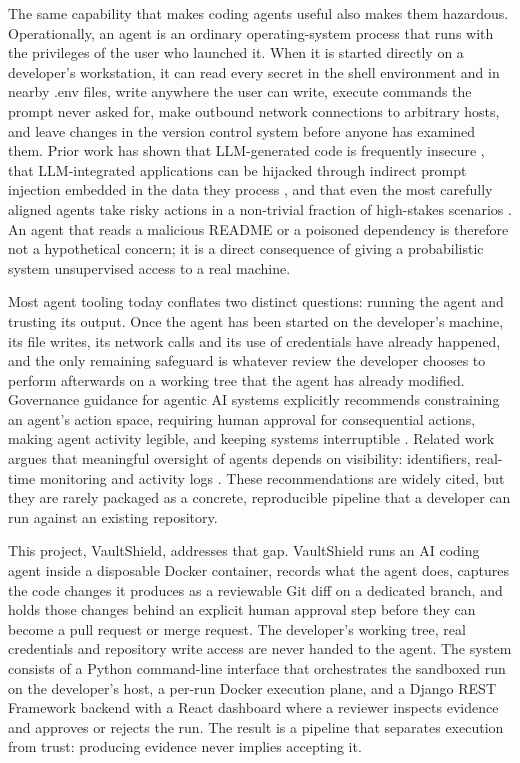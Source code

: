 \documentclass[12pt,a4paper,oneside]{report}
\begin{document}
The same capability that makes coding agents useful also makes them hazardous. Operationally, an agent is an ordinary operating-system process that runs with the privileges of the user who launched it. When it is started directly on a developer's workstation, it can read every secret in the shell environment and in nearby .env files, write anywhere the user can write, execute commands the prompt never asked for, make outbound network connections to arbitrary hosts, and leave changes in the version control system before anyone has examined them. Prior work has shown that LLM-generated code is frequently insecure \cite{ref8}, that LLM-integrated applications can be hijacked through indirect prompt injection embedded in the data they process \cite{ref7}, and that even the most carefully aligned agents take risky actions in a non-trivial fraction of high-stakes scenarios \cite{ref5}. An agent that reads a malicious README or a poisoned dependency is therefore not a hypothetical concern; it is a direct consequence of giving a probabilistic system unsupervised access to a real machine.

Most agent tooling today conflates two distinct questions: running the agent and trusting its output. Once the agent has been started on the developer's machine, its file writes, its network calls and its use of credentials have already happened, and the only remaining safeguard is whatever review the developer chooses to perform afterwards on a working tree that the agent has already modified. Governance guidance for agentic AI systems explicitly recommends constraining an agent's action space, requiring human approval for consequential actions, making agent activity legible, and keeping systems interruptible \cite{ref9}. Related work argues that meaningful oversight of agents depends on visibility: identifiers, real-time monitoring and activity logs \cite{ref10}. These recommendations are widely cited, but they are rarely packaged as a concrete, reproducible pipeline that a developer can run against an existing repository.

This project, VaultShield, addresses that gap. VaultShield runs an AI coding agent inside a disposable Docker container, records what the agent does, captures the code changes it produces as a reviewable Git diff on a dedicated branch, and holds those changes behind an explicit human approval step before they can become a pull request or merge request. The developer's working tree, real credentials and repository write access are never handed to the agent. The system consists of a Python command-line interface that orchestrates the sandboxed run on the developer's host, a per-run Docker execution plane, and a Django REST Framework backend with a React dashboard where a reviewer inspects evidence and approves or rejects the run. The result is a pipeline that separates execution from trust: producing evidence never implies accepting it.
\end{document}
